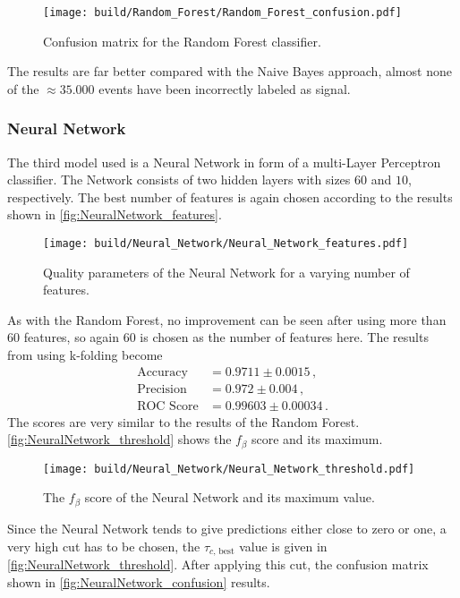 \begin{figure}[H]
  \centering
  \texttt{[image: build/Random\_Forest/Random\_Forest\_confusion.pdf]}
  \caption{Confusion matrix for the Random Forest classifier.}
  \label{fig:RandomForest_confusion}
\end{figure}

The results are far better compared with the Naive Bayes approach, almost none of the
$\approx 35.000$ events have been incorrectly labeled as signal.

\subsubsection{Neural Network}

The third model used is a Neural Network in form of a multi-Layer Perceptron classifier.
The Network consists of two hidden layers with sizes $60$ and $10$, respectively.
The best number of features is again chosen according to the results shown in
\autoref{fig:NeuralNetwork_features}.

\begin{figure}[H]
  \centering
  \texttt{[image: build/Neural\_Network/Neural\_Network\_features.pdf]}
  \caption{Quality parameters of the Neural Network for a varying number of features.}
  \label{fig:NeuralNetwork_features}
\end{figure}

As with the Random Forest, no improvement can be seen after using more than
$60$ features, so again $60$ is chosen as the number of features here.
The results from using k-folding become
\begin{align*}
  \text{Accuracy} &= 0.9711\pm0.0015 \,, \\
  \text{Precision} &= 0.972\pm0.004 \,, \\
  \text{ROC Score} &= 0.99603\pm0.00034 \,.
\end{align*}
The scores are very similar to the results of the Random Forest.
\autoref{fig:NeuralNetwork_threshold} shows the $f_\beta$ score and its maximum.

\begin{figure}[H]
  \centering
  \texttt{[image: build/Neural\_Network/Neural\_Network\_threshold.pdf]}
  \caption{The $f_\beta$ score of the Neural Network and its maximum value.}
  \label{fig:NeuralNetwork_threshold}
\end{figure}

Since the Neural Network tends to give predictions either close to zero or one,
a very high cut has to be chosen, the $\tau_{c \text{, best}}$ value is given in
\autoref{fig:NeuralNetwork_threshold}.
After applying this cut, the confusion matrix shown in \autoref{fig:NeuralNetwork_confusion}
results.

